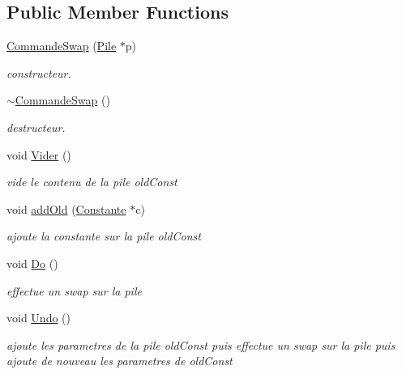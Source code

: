 \subsection*{Public Member Functions}
\begin{DoxyCompactItemize}
\item 
\hyperlink{class_commande_swap_a43a2f1b3aecdecc4fb14beb87783d9a2}{Commande\-Swap} (\hyperlink{class_pile}{Pile} $\ast$p)
\begin{DoxyCompactList}\small\item\em constructeur. \end{DoxyCompactList}\item 
\hypertarget{class_commande_swap_aaf63b2e5b1b4a6f5dbe6ae54641cac8b}{\hyperlink{class_commande_swap_aaf63b2e5b1b4a6f5dbe6ae54641cac8b}{$\sim$\-Commande\-Swap} ()}\label{class_commande_swap_aaf63b2e5b1b4a6f5dbe6ae54641cac8b}

\begin{DoxyCompactList}\small\item\em destructeur. \end{DoxyCompactList}\item 
\hypertarget{class_commande_swap_a5fcff8fc75c894dd46431280dddeba1e}{void \hyperlink{class_commande_swap_a5fcff8fc75c894dd46431280dddeba1e}{Vider} ()}\label{class_commande_swap_a5fcff8fc75c894dd46431280dddeba1e}

\begin{DoxyCompactList}\small\item\em vide le contenu de la pile old\-Const \end{DoxyCompactList}\item 
void \hyperlink{class_commande_swap_ac633e1a690413c200a11638d69f06afb}{add\-Old} (\hyperlink{class_constante}{Constante} $\ast$c)
\begin{DoxyCompactList}\small\item\em ajoute la constante sur la pile old\-Const \end{DoxyCompactList}\item 
\hypertarget{class_commande_swap_a955666912c56a1c71b7579d837bc3762}{void \hyperlink{class_commande_swap_a955666912c56a1c71b7579d837bc3762}{Do} ()}\label{class_commande_swap_a955666912c56a1c71b7579d837bc3762}

\begin{DoxyCompactList}\small\item\em effectue un swap sur la pile \end{DoxyCompactList}\item 
\hypertarget{class_commande_swap_a9d2f74b321b071df3a81abf2f1f0b40d}{void \hyperlink{class_commande_swap_a9d2f74b321b071df3a81abf2f1f0b40d}{Undo} ()}\label{class_commande_swap_a9d2f74b321b071df3a81abf2f1f0b40d}

\begin{DoxyCompactList}\small\item\em ajoute les parametres de la pile old\-Const puis effectue un swap sur la pile puis ajoute de nouveau les parametres de old\-Const \end{DoxyCompactList}\end{DoxyCompactItemize}


